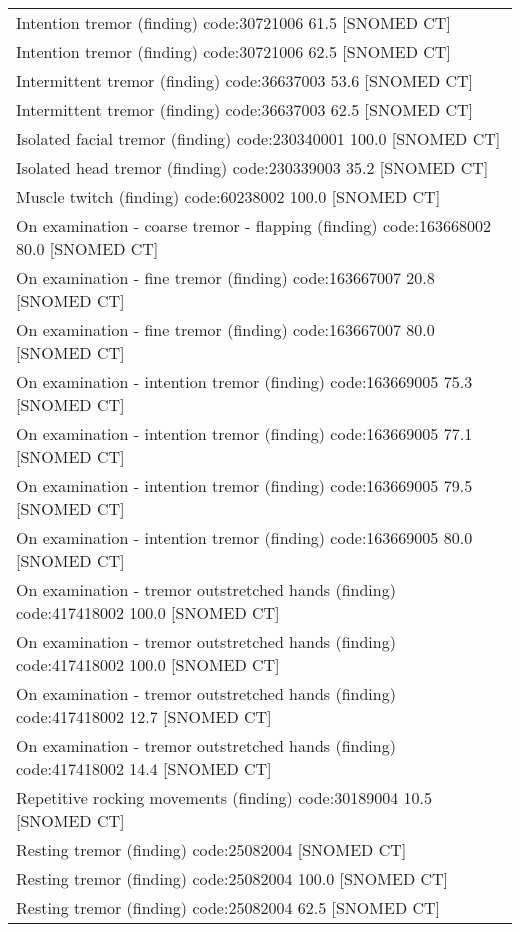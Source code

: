 \documentclass[10pt, letterpaper]{article}
\begin{document}
\begin{spacing}{1.0}
\begin{footnotesize}
\begin{longtable}[H]{l}
        Intention tremor (finding) code:30721006 61.5 [SNOMED CT]\\
        Intention tremor (finding) code:30721006 62.5 [SNOMED CT]\\
        Intermittent tremor (finding) code:36637003 53.6 [SNOMED CT]\\
        Intermittent tremor (finding) code:36637003 62.5 [SNOMED CT]\\
        Isolated facial tremor (finding) code:230340001 100.0 [SNOMED CT]\\
        Isolated head tremor (finding) code:230339003 35.2 [SNOMED CT]\\
        Muscle twitch (finding) code:60238002 100.0 [SNOMED CT]\\
        On examination - coarse tremor - flapping (finding) code:163668002 80.0 [SNOMED CT]\\
        On examination - fine tremor (finding) code:163667007 20.8 [SNOMED CT]\\
        On examination - fine tremor (finding) code:163667007 80.0 [SNOMED CT]\\
        On examination - intention tremor (finding) code:163669005 75.3 [SNOMED CT]\\
        On examination - intention tremor (finding) code:163669005 77.1 [SNOMED CT]\\
        On examination - intention tremor (finding) code:163669005 79.5 [SNOMED CT]\\
        On examination - intention tremor (finding) code:163669005 80.0 [SNOMED CT]\\
        On examination - tremor outstretched hands (finding) code:417418002  100.0 [SNOMED CT]\\
        On examination - tremor outstretched hands (finding) code:417418002 100.0 [SNOMED CT]\\
        On examination - tremor outstretched hands (finding) code:417418002 12.7 [SNOMED CT]\\
        On examination - tremor outstretched hands (finding) code:417418002 14.4 [SNOMED CT]\\
        Repetitive rocking movements (finding) code:30189004 10.5 [SNOMED CT]\\
        Resting tremor (finding) code:25082004 [SNOMED CT]\\
        Resting tremor (finding) code:25082004 100.0 [SNOMED CT]\\
        Resting tremor (finding) code:25082004 62.5 [SNOMED CT]\\

\end{longtable}
\end{footnotesize}
\end{spacing}
\end{document}
